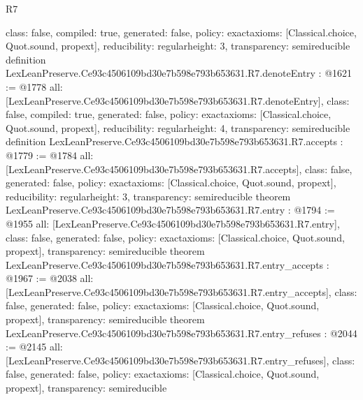 \begin{lexlean}{R7}
\begin{coremodule}
{  class: false,
  compiled: true,
  generated: false,
  policy: exact{axioms: [Classical.choice, Quot.sound, propext]},
  reducibility: regular{height: 3},
  transparency: semireducible
}
definition LexLeanPreserve.Ce93c4506109bd30e7b598e793b653631.R7.denoteEntry : @1621 := @1778 {
  all: [LexLeanPreserve.Ce93c4506109bd30e7b598e793b653631.R7.denoteEntry],
  class: false,
  compiled: true,
  generated: false,
  policy: exact{axioms: [Classical.choice, Quot.sound, propext]},
  reducibility: regular{height: 4},
  transparency: semireducible
}
definition LexLeanPreserve.Ce93c4506109bd30e7b598e793b653631.R7.accepts : @1779 := @1784 {
  all: [LexLeanPreserve.Ce93c4506109bd30e7b598e793b653631.R7.accepts],
  class: false,
  generated: false,
  policy: exact{axioms: [Classical.choice, Quot.sound, propext]},
  reducibility: regular{height: 3},
  transparency: semireducible
}
theorem LexLeanPreserve.Ce93c4506109bd30e7b598e793b653631.R7.entry : @1794 := @1955 {
  all: [LexLeanPreserve.Ce93c4506109bd30e7b598e793b653631.R7.entry],
  class: false,
  generated: false,
  policy: exact{axioms: [Classical.choice, Quot.sound, propext]},
  transparency: semireducible
}
theorem LexLeanPreserve.Ce93c4506109bd30e7b598e793b653631.R7.entry_accepts : @1967 := @2038 {
  all: [LexLeanPreserve.Ce93c4506109bd30e7b598e793b653631.R7.entry_accepts],
  class: false,
  generated: false,
  policy: exact{axioms: [Classical.choice, Quot.sound, propext]},
  transparency: semireducible
}
theorem LexLeanPreserve.Ce93c4506109bd30e7b598e793b653631.R7.entry_refuses : @2044 := @2145 {
  all: [LexLeanPreserve.Ce93c4506109bd30e7b598e793b653631.R7.entry_refuses],
  class: false,
  generated: false,
  policy: exact{axioms: [Classical.choice, Quot.sound, propext]},
  transparency: semireducible
}


\end{coremodule}
\end{lexlean}

